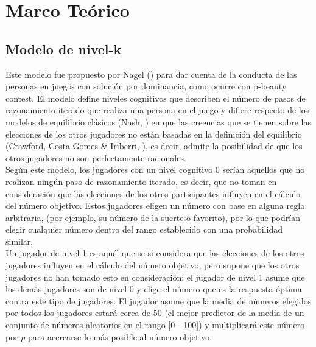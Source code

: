 \chapter{Marco Teórico} %

\label{Cap_SDT} %


\newcommand{\keyword}[1]{\textbf{#1}}
\newcommand{\tabhead}[1]{\textbf{#1}}
\newcommand{\code}[1]{\texttt{#1}}
\newcommand{\file}[1]{\texttt{\bfseries#1}}
\newcommand{\option}[1]{\texttt{\itshape#1}}


\section{Modelo de nivel-k}

Este modelo fue propuesto por Nagel (\citeyear{Nagel}) para dar cuenta de la conducta de las personas en juegos con solución por dominancia, como ocurre con p-beauty contest. El modelo define niveles cognitivos que describen el número de pasos de razonamiento iterado que realiza una persona en el juego y difiere respecto de los modelos de equilibrio clásicos (Nash, \citeyear{Nash}) en que las creencias que se tienen sobre las elecciones de los otros jugadores no están basadas en la definición del equilibrio (Crawford, Costa-Gomes & Iriberri, \citeyear{Crawford}), es decir, admite la posibilidad de que los otros jugadores no son perfectamente racionales.\\

Según este modelo, los jugadores con un nivel cognitivo 0 serían aquellos que no realizan ningún paso de razonamiento iterado, es decir, que no toman en consideración que las elecciones de los otros participantes inﬂuyen en el cálculo del número objetivo. Estos jugadores eligen un número con base en alguna regla arbitraria, (por ejemplo, su número de la suerte o favorito), por lo que podrían elegir cualquier número dentro del rango establecido con una probabilidad similar.\\

Un jugador de nivel 1 es aquél que se sí considera que las elecciones de los otros jugadores influyen en el cálculo del número objetivo, pero supone que los otros jugadores no han tomado esto en consideración; el jugador de nivel 1 asume que los demás jugadores son de nivel 0 y elige el número que es la respuesta óptima contra este tipo de jugadores. El jugador asume que la media de números elegidos por todos los jugadores estará cerca de 50 (el mejor predictor de la media de un conjunto de números aleatorios en el rango [0 - 100]) y multiplicará este número por $p$ para acercarse lo más posible al número objetivo.\\

